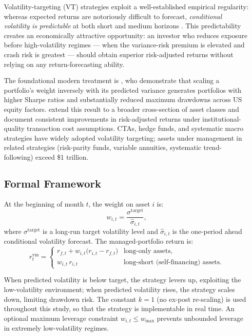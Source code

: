 \documentclass[12pt, a4paper]{article}
\newcommand{\stgt}{\sigma^{\mathrm{target}}}
\newcommand{\shat}{\hat{\sigma}}
\begin{document}
Volatility-targeting (VT) strategies exploit a well-established empirical regularity:
whereas expected returns are notoriously difficult to forecast, \emph{conditional
volatility is predictable} at both short and medium horizons \citep{Andersen2003}. This
predictability creates an economically attractive opportunity: an investor who reduces
exposure before high-volatility regimes --- when the variance-risk premium is elevated and
crash risk is greatest --- should obtain superior risk-adjusted returns without relying on
any return-forecasting ability.

The foundational modern treatment is \citet{Moreira2017}, who demonstrate that scaling a
portfolio's weight inversely with its predicted variance generates portfolios with higher
Sharpe ratios and substantially reduced maximum drawdowns across US equity factors.
\citet{Harvey2018} extend this result to a broader cross-section of asset classes and
document consistent improvements in risk-adjusted returns under institutional-quality
transaction cost assumptions. CTAs, hedge funds, and systematic macro strategies have
widely adopted volatility targeting; assets under management in related strategies
(risk-parity funds, variable annuities, systematic trend-following) exceed \$1 trillion.

\subsection{Formal Framework}

At the beginning of month $t$, the weight on asset $i$ is:
\begin{equation}
  w_{i,t} = \frac{\stgt}{\shat_{i,t}},
  \label{eq:weight}
\end{equation}
where $\stgt$ is a long-run target volatility level and $\shat_{i,t}$ is the one-period
ahead conditional volatility forecast. The managed-portfolio return is:
\begin{equation}
  r_t^{\mathrm{vm}} =
  \begin{cases}
    r_{f,t} + w_{i,t}\bigl(r_{i,t} - r_{f,t}\bigr) & \text{long-only assets,}\\
    w_{i,t}\, r_{i,t} & \text{long-short (self-financing) assets.}
  \end{cases}
  \label{eq:returns}
\end{equation}

When predicted volatility is below target, the strategy levers up, exploiting the
low-volatility environment; when predicted volatility rises, the strategy scales down,
limiting drawdown risk. The constant $k=1$ (no ex-post re-scaling) is used throughout
this study, so that the strategy is implementable in real time. An optional maximum
leverage constraint $w_{i,t} \leq w_{\max}$ prevents unbounded leverage in extremely
low-volatility regimes.
\end{document}
